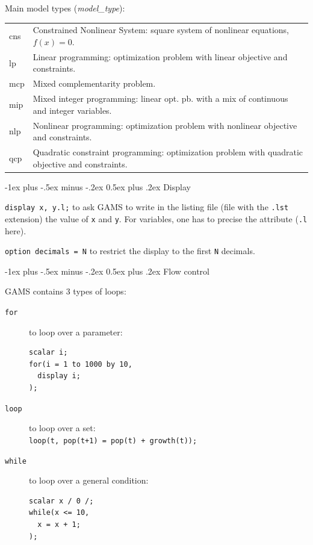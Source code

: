\documentclass[10pt,landscape,a4paper]{article}
\makeatletter
\renewcommand{\section}{\@startsection{section}{1}{0mm}%
                                {-1ex plus -.5ex minus -.2ex}%
                                {0.5ex plus .2ex}%
                                {\color{blue}\normalfont\large\bfseries}}
\makeatother
\begin{document}
\begin{multicols}{2}
Main model types (\emph{model\_type}):\\
\begin{tabularx}{\columnwidth}{@{}>{\ttfamily}lX@{}}
cns  & Constrained Nonlinear System: square system of nonlinear
equations, $f\left(x\right)=0$.\\
lp  & Linear programming: optimization problem with linear objective and constraints.\\
mcp  & Mixed complementarity problem.\\
mip & Mixed integer programming: linear opt. pb. with a mix of
continuous and integer variables.\\
nlp  & Nonlinear programming: optimization problem with nonlinear
objective and constraints.\\
qcp  & Quadratic constraint programming: optimization problem with
quadratic objective and constraints.
\end{tabularx}

\section{Display}

\verb!display x, y.l;! to ask GAMS to write in the listing file (file with the
\texttt{.lst} extension) the value of \verb!x!  and \verb!y!. For variables, one
has to precise the attribute (\verb!.l! here).

\verb!option decimals = N! to restrict the display to the first \verb!N!
decimals.

\section{Flow control}

GAMS contains 3 types of loops:
\begin{description}
\item[\texttt{for}] to loop over a parameter:\\
\begin{verbatim}
scalar i;
for(i = 1 to 1000 by 10,
  display i;
);
\end{verbatim}
\item[\texttt{loop}] to loop over a set:\\
  \verb!loop(t, pop(t+1) = pop(t) + growth(t));!
\item[\texttt{while}] to loop over a general condition:\\
\begin{verbatim}
scalar x / 0 /;
while(x <= 10,
  x = x + 1;
);
\end{verbatim}
\end{description}


\end{multicols}
\end{document}
